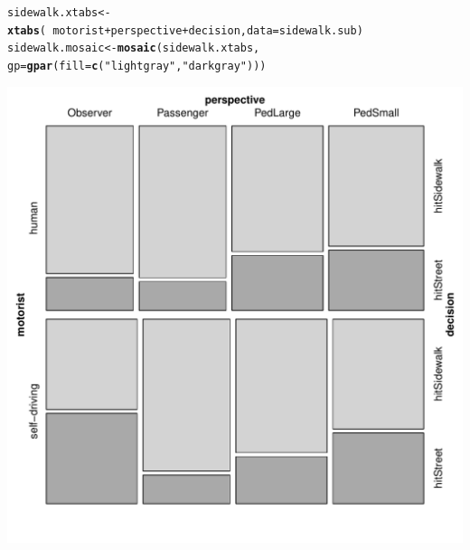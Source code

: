 \documentclass{scrartcl}\usepackage[]{graphicx}\usepackage[]{color}
\makeatletter
\def\maxwidth{ %
  \ifdim\Gin@nat@width>\linewidth
    \linewidth
  \else
    \Gin@nat@width
  \fi
}
\newcommand{\hlstr}[1]{\textcolor[rgb]{0.192,0.494,0.8}{#1}}%
\newcommand{\hlopt}[1]{\textcolor[rgb]{0,0,0}{#1}}%
\newcommand{\hlstd}[1]{\textcolor[rgb]{0.345,0.345,0.345}{#1}}%
\newcommand{\hlkwb}[1]{\textcolor[rgb]{0.69,0.353,0.396}{#1}}%
\newcommand{\hlkwc}[1]{\textcolor[rgb]{0.333,0.667,0.333}{#1}}%
\newcommand{\hlkwd}[1]{\textcolor[rgb]{0.737,0.353,0.396}{\textbf{#1}}}%
\newenvironment{kframe}{%
 \def\at@end@of@kframe{}%
 \ifinner\ifhmode%
  \def\at@end@of@kframe{\end{minipage}}%
  \begin{minipage}{\columnwidth}%
 \fi\fi%
 \def\FrameCommand##1{\hskip\@totalleftmargin \hskip-\fboxsep
 \colorbox{shadecolor}{##1}\hskip-\fboxsep
     \hskip-\linewidth \hskip-\@totalleftmargin \hskip\columnwidth}%
 \MakeFramed {\advance\hsize-\width
   \@totalleftmargin\z@ \linewidth\hsize
   \@setminipage}}%
 {\par\unskip\endMakeFramed%
 \at@end@of@kframe}
\newenvironment{knitrout}{}{} %
\makeatother
\begin{document}
\begin{knitrout}
\color{fgcolor}\begin{kframe}
\begin{alltt}
\hlstd{sidewalk.xtabs} \hlkwb{<-} \hlkwd{xtabs}\hlstd{(}\hlopt{~} \hlstd{motorist} \hlopt{+} \hlstd{perspective} \hlopt{+} \hlstd{decision,} \hlkwc{data} \hlstd{= sidewalk.sub)}
\hlstd{sidewalk.mosaic} \hlkwb{<-} \hlkwd{mosaic}\hlstd{(sidewalk.xtabs,}
                       \hlkwc{gp} \hlstd{=} \hlkwd{gpar}\hlstd{(}\hlkwc{fill} \hlstd{=} \hlkwd{c}\hlstd{(}\hlstr{"light gray"}\hlstd{,} \hlstr{"dark gray"}\hlstd{)))}
\end{alltt}
\end{kframe}
\includegraphics[width=\maxwidth]{figure/sidewalk-mosaic-1} 

\end{knitrout}
\end{document}
